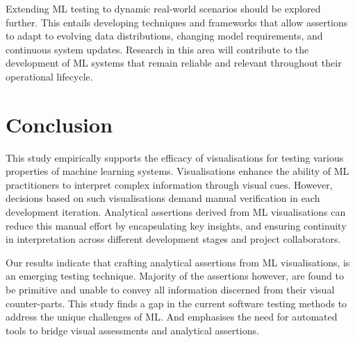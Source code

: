 \documentclass[conference]{IEEEtran}
\begin{document}
Extending ML testing to dynamic real-world scenarios should be explored further. This entails developing techniques and frameworks that allow assertions to adapt to evolving data distributions, changing model requirements, and continuous system updates. Research in this area will contribute to the development of ML systems that remain reliable and relevant throughout their operational lifecycle.

\section{Conclusion}\label{sec:conclude}

This study empirically supports the efficacy of visualisations for testing various properties of machine learning systems. Visualisations enhance the ability of ML practitioners to interpret complex information through visual cues. However, decisions based on such visualisations demand manual verification in each development iteration. Analytical assertions derived from ML visualisations can reduce this manual effort by encapsulating key insights, and ensuring continuity in interpretation across different development stages and project collaborators.

Our results indicate that crafting analytical assertions from ML visualisations, is an emerging testing technique. Majority of the assertions however, are found to be primitive and unable to convey all information discerned from their visual counter-parts. This study finds a gap in the current software testing methods to address the unique challenges of ML. And emphasises the need for automated tools to bridge visual assessments and analytical assertions.



\end{document}
